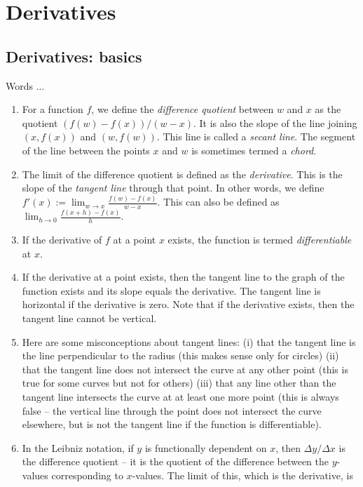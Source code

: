 \documentclass[10pt]{amsart}
\begin{document}
\section{Derivatives}

\subsection{Derivatives: basics}

Words ...

\begin{enumerate}
\item For a function $f$, we define the {\em difference quotient}
  between $w$ and $x$ as the quotient $(f(w) - f(x))/(w - x)$. It is
  also the slope of the line joining $(x,f(x))$ and $(w,f(w))$. This
  line is called a {\em secant line}. The segment of the line between the
  points $x$ and $w$ is sometimes termed a {\em chord}.
\item The limit of the difference quotient is defined as the {\em
  derivative}. This is the slope of the {\em tangent line} through
  that point. In other words, we define $f'(x) := \lim_{w \to x}
  \frac{f(w) - f(x)}{w - x}$. This can also be defined as $\lim_{h \to
  0} \frac{f(x + h) - f(x)}{h}$.
\item If the derivative of $f$ at a point $x$ exists, the function is
  termed {\em differentiable} at $x$.
\item If the derivative at a point exists, then the tangent line to
  the graph of the function exists and its slope equals the
  derivative. The tangent line is horizontal if the derivative is
  zero. Note that if the derivative exists, then the tangent line
  cannot be vertical.
\item Here are some misconceptions about tangent lines: (i) that the
  tangent line is the line perpendicular to the radius (this makes
  sense only for circles) (ii) that the tangent line does not
  intersect the curve at any other point (this is true for some curves
  but not for others) (iii) that any line other than the tangent line
  intersects the curve at at least one more point (this is always
  false -- the vertical line through the point does not intersect the
  curve elsewhere, but is not the tangent line if the function is
  differentiable).
\item In the Leibniz notation, if $y$ is functionally dependent on
  $x$, then $\Delta y/\Delta x$ is the difference quotient -- it is
  the quotient of the difference between the $y$-values corresponding
  to $x$-values. The limit of this, which is the derivative, is

\end{enumerate}
\end{document}
